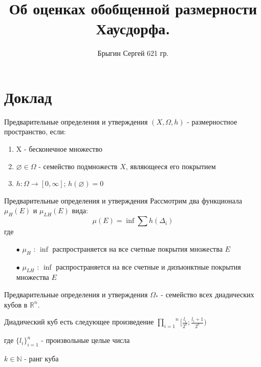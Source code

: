 \documentclass{beamer}
\title[Your Short Title]{Об оценках обобщенной размерности Хаусдорфа.}
\institute{ }
\author{Брыгин Сергей 621 гр.}
\date{ }
\begin{document}
\begin{frame}
  \titlepage
\end{frame}

\section{Доклад}


% 
%
%
\begin{frame}{Предварительные определения и утверждения}
    $(X, \Omega, h)$ - размерностное пространство, если:
    \begin{enumerate}
        \item  X - бесконечное множество
        \item $\varnothing \in \Omega$ - семейство подмножеств $X$, являющееся его покрытием
        \item $h : \Omega \to [0, \infty]$; $h(\varnothing) = 0$
    \end{enumerate}
\end{frame}

% 
\begin{frame}{Предварительные определения и утверждения}
    Рассмотрим два функционала $\mu_H (E)$ и $\mu_{LH} (E)$ вида:
    $$\mu(E) = \inf{\sum{h(\Delta_i)}}$$
    где
    \begin{enumerate}
        \item[$\bullet$] $\mu_H$ : $\inf$ распространяется на все счетные покрытия множества $E$
        \item[$\bullet$] $\mu_{LH}$ : $\inf$ распространяется на все счетные и дизъюнктные покрытия множества $E$
    \end{enumerate}
\end{frame}

%
\begin{frame}{Предварительные определения и утверждения}
      $\Omega_*$ - семейство всех  диадических кубов в $\mathbb{R}^n$.
      
      Диадический куб есть следующее произведение
      $\overset{n}{ \underset{i = 1}{ \prod } } [ \frac{l_i}{2^k}; \frac{l_i + 1}{2^k} )$ 
      
      где $\{l_i\}_{i=1}^n$ - произвольные целые числа
      
      $k \in \mathbb{N}$ - ранг куба
\end{frame}
\end{document}
